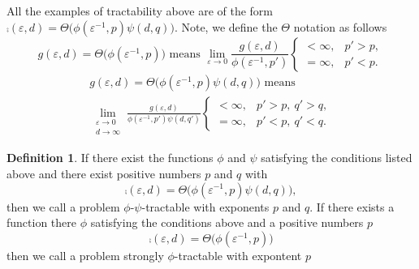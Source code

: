 \documentclass{article}
\theoremstyle{definition}
\newtheorem{definition}{Definition}
\begin{document}
All the examples of tractability above are of the form $\comp(\varepsilon, d) = \Theta \bigl( \phi(\varepsilon^{-1},p) \psi(d,q)\bigr)$.  Note, we define the $\Theta$ notation as follows
\begin{equation*}
     g(\varepsilon,d) = \Theta\bigl(\phi(\varepsilon^{-1},p) \bigr) \text{ means } 
    \lim_{\varepsilon \to 0} \frac{g(\varepsilon,d)}{\phi(\varepsilon^{-1},p')}
           \begin{cases} < \infty, & p'> p,  \\ 
          =\infty, & p' < p.\end{cases}
\end{equation*}
\begin{multline*}
     g(\varepsilon,d) = \Theta\bigl(\phi(\varepsilon^{-1},p) \psi(d,q) \bigr) \text{ means } \\
    \lim_{\substack{\varepsilon \to 0 \\ d \to \infty}} \frac{g(\varepsilon,d)}{\phi(\varepsilon^{-1},p') \psi(d,q')}
          \begin{cases} < \infty, & p'> p, \  q' > q,  \\ 
          =\infty, & p' < p, \ q' < q.\end{cases}
\end{multline*}


\begin{definition}
If there exist the functions $\phi$ and $\psi$ satisfying the conditions listed above and there exist positive numbers $p$ and $q$ with
\[
\comp(\varepsilon, d)  = \Theta\bigl(\phi(\varepsilon^{-1},p) \psi(d,q) \bigr),
\]
then we call a problem $\phi$-$\psi$-tractable with exponents $p$ and $q$.  If there exists a function there $\phi$ satisfying the conditions above and a positive numbers $p$
\[
\comp(\varepsilon, d)  = \Theta\bigl(\phi(\varepsilon^{-1},p) \bigr)
\]
then we call a problem strongly $\phi$-tractable with expontent $p$
\end{definition}
\end{document}
